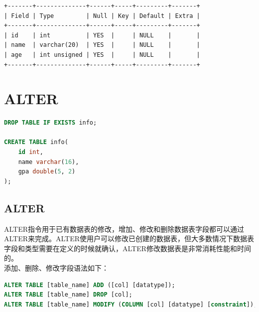 \documentclass[12pt, openany, oneside]{book}
\begin{document}
\begin{tcolorbox}
	\begin{verbatim}
+-------+--------------+------+-----+---------+-------+
| Field | Type         | Null | Key | Default | Extra |
+-------+--------------+------+-----+---------+-------+
| id    | int          | YES  |     | NULL    |       |
| name  | varchar(20)  | YES  |     | NULL    |       |
| age   | int unsigned | YES  |     | NULL    |       |
+-------+--------------+------+-----+---------+-------+
\end{verbatim}
\end{tcolorbox}

\newpage

\chapter{ALTER}

\vspace{0.5cm}


\begin{lstlisting}[language=SQL]
DROP TABLE IF EXISTS info;

CREATE TABLE info(
    id int, 
    name varchar(16), 
    gpa double(5, 2)
);
\end{lstlisting}

\vspace{0.5cm}

\section{ALTER}

ALTER指令用于已有数据表的修改，增加、修改和删除数据表字段都可以通过ALTER来完成。ALTER使用户可以修改已创建的数据表，但大多数情况下数据表字段和类型需要在定义的时候就确认，ALTER修改数据表是非常消耗性能和时间的。\\

添加、删除、修改字段语法如下：

\vspace{-0.5cm}

\begin{lstlisting}[language=SQL]
ALTER TABLE [table_name] ADD ([col] [datatype]);
ALTER TABLE [table_name] DROP [col];
ALTER TABLE [table_name] MODIFY (COLUMN [col] [datatype] [constraint]);
\end{lstlisting}

\vspace{0.5cm}
\end{document}
